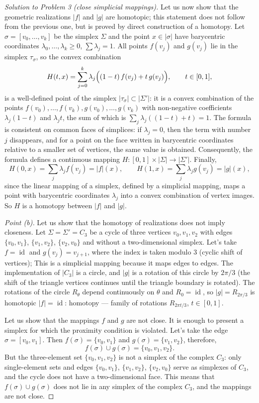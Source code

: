 \documentclass[a4paper,12pt]{report}
\begin{document}
\begin{proof}[Solution to Problem \textup{3} \textup{(}close simplicial mappings\textup{)}]
Let us now show that the geometric realizations $|f|$ and $|g|$ are homotopic; this statement does not follow from the previous one, but is proved by direct construction of a homotopy. Let $\sigma=[v_0,\dots,v_k]$ be the simplex $\Sigma$ and the point $x\in|\sigma|$ have barycentric coordinates $\lambda_0,\dots,\lambda_k\ge0$, $\sum\lambda_j=1$. All points $f(v_j)$ and $g(v_j)$ lie in the simplex $\tau_\sigma$, so the convex combination
\[
H(t,x)=\sum_{j=0}^{k}\lambda_j\Bigl((1-t)\,f(v_j)+t\,g(v_j)\Bigr),\qquad t\in[0,1],
\]
is a well-defined point of the simplex $|\tau_\sigma|\subset|\Sigma'|$: it is a convex combination of the points $f(v_0),\dots,f(v_k),g(v_0),\dots,g(v_k)$ with non-negative coefficients $\lambda_j(1-t)$ and $\lambda_jt$, the sum of which is $\sum_j\lambda_j((1-t)+t)=1$. The formula is consistent on common faces of simplices: if $\lambda_j=0$, then the term with number $j$ disappears, and for a point on the face written in barycentric coordinates relative to a smaller set of vertices, the same value is obtained. Consequently, the formula defines a continuous mapping $H\colon[0,1]\times|\Sigma|\to|\Sigma'|$. Finally,
\[
H(0,x)=\sum_j\lambda_j f(v_j)=|f|(x),\qquad H(1,x)=\sum_j\lambda_j g(v_j)=|g|(x),
\]
since the linear mapping of a simplex, defined by a simplicial mapping, maps a point with barycentric coordinates $\lambda_j$ into a convex combination of vertex images. So $H$ is a homotopy between $|f|$ and $|g|$.

\textit{Point \textup{(b)}.} Let us show that the homotopy of realizations does not imply closeness. Let $\Sigma=\Sigma'=C_3$ be a cycle of three vertices $v_0,v_1,v_2$ with edges $\{v_0,v_1\}$, $\{v_1,v_2\}$, $\{v_2,v_0\}$ and without a two-dimensional simplex. Let's take $f=\operatorname{id}$ and $g(v_j)=v_{j+1}$, where the index is taken modulo $3$ \textup{(}cyclic shift of vertices\textup{)}; This is a simplicial mapping because it maps edges to edges. The implementation of $|C_3|$ is a circle, and $|g|$ is a rotation of this circle by $2\pi/3$ \textup{(}the shift of the triangle vertices continues until the triangle boundary is rotated\textup{)}. The rotations of the circle $R_\theta$ depend continuously on $\theta$ and $R_0=\operatorname{id}$, so $|g|=R_{2\pi/3}$ is homotopic $|f|=\operatorname{id}$: homotopy --- family of rotations $R_{2\pi t/3}$, $t\in[0,1]$.

Let us show that the mappings $f$ and $g$ are not close. It is enough to present a simplex for which the proximity condition is violated. Let's take the edge $\sigma=[v_0,v_1]$. Then $f(\sigma)=\{v_0,v_1\}$ and $g(\sigma)=\{v_1,v_2\}$, therefore,
\[
f(\sigma)\cup g(\sigma)=\{v_0,v_1,v_2\} .
\]
But the three-element set $\{v_0,v_1,v_2\}$ is not a simplex of the complex $C_3$: only single-element sets and edges $\{v_0,v_1\}$, $\{v_1,v_2\}$, $\{v_2,v_0\}$ serve as simplexes of $C_3$, and the cycle does not have a two-dimensional face. This means that $f(\sigma)\cup g(\sigma)$ does not lie in any simplex of the complex $C_3$, and the mappings are not close.


\end{proof}
\end{document}
